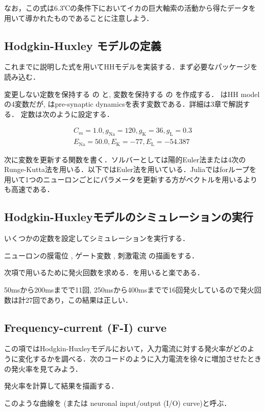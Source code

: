 なお，この式は6.3℃の条件下においてイカの巨大軸索の活動から得たデータを用いて導かれたものであることに注意しよう．
\subsection{Hodgkin-Huxley モデルの定義}
これまでに説明した式を用いてHHモデルを実装する．まず必要なパッケージを読み込む．

変更しない定数を保持する  の  と, 変数を保持する  の  を作成する． はHH modelの4変数だが,  はpre-synaptic dynamicsを表す変数である．詳細は3章で解説する． 定数は次のように設定する． 


\begin{align}
C_m=1.0, g_{\text{Na}}=120, g_{\text{K}}=36, g_{\text{L}}=0.3\\
E_{\text{Na}}=50.0, E_{\text{K}}=-77, E_{\text{L}}=-54.387 
\end{align}


次に変数を更新する関数を書く．ソルバーとしては陽的Euler法または4次のRunge-Kutta法を用いる．以下ではEuler法を用いている．Juliaではforループを用いて1つのニューロンごとにパラメータを更新する方がベクトルを用いるよりも高速である．

\subsection{Hodgkin-Huxleyモデルのシミュレーションの実行}
いくつかの定数を設定してシミュレーションを実行する．

ニューロンの膜電位 , ゲート変数 , 刺激電流 の描画をする．


次項で用いるために発火回数を求める．を用いると楽である．

50msから200msまでで11回, 250msから400msまでで16回発火しているので発火回数は計27回であり，この結果は正しい．
\subsection{Frequency-current (F-I) curve}
この項ではHodgkin-Huxleyモデルにおいて，入力電流に対する発火率がどのように変化するかを調べる．次のコードのように入力電流を徐々に増加させたときの発火率を見てみよう．

発火率を計算して結果を描画する．



このような曲線を\textbf{} (または neuronal input/output (I/O) curve)と呼ぶ．
